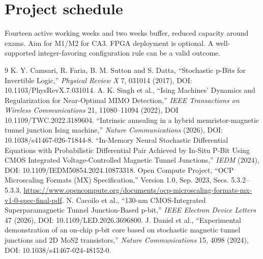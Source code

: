 \documentclass[11pt,a4paper]{article}
\begin{document}
\section{Project schedule}
Fourteen active working weeks and two weeks buffer, reduced capacity around exams. Aim for M1/M2 for CA3. FPGA deployment is optional. A well-supported integer-favoring configuration rule can be a valid outcome.
\begin{thebibliography}{9}
 K. Y. Camsari, R. Faria, B. M. Sutton and S. Datta, ``Stochastic p-Bits for Invertible Logic,'' \emph{Physical Review X} 7, 031014 (2017), DOI: 10.1103/PhysRevX.7.031014.
 A. K. Singh et al., ``Ising Machines' Dynamics and Regularization for Near-Optimal MIMO Detection,'' \emph{IEEE Transactions on Wireless Communications} 21, 11080--11094 (2022), DOI 10.1109/TWC.2022.3189604.
 ``Intrinsic annealing in a hybrid memristor-magnetic tunnel junction Ising machine,'' \emph{Nature Communications} (2026), DOI: 10.1038/s41467-026-71844-8.
 ``In-Memory Neural Stochastic Differential Equations with Probabilistic Differential Pair Achieved by In-Situ P-Bit Using CMOS Integrated Voltage-Controlled Magnetic Tunnel Junctions,'' \emph{IEDM} (2024), DOI: 10.1109/IEDM50854.2024.10873318.
 Open Compute Project, ``OCP Microscaling Formats (MX) Specification,'' Version 1.0, Sep. 2023, Secs. 5.3.2--5.3.3, \url{https://www.opencompute.org/documents/ocp-microscaling-formats-mx-v1-0-spec-final-pdf}.
 N. Cacoilo et al., ``130-nm CMOS-Integrated Superparamagnetic Tunnel Junction-Based p-bit,'' \emph{IEEE Electron Device Letters} 47 (2026), DOI: 10.1109/LED.2026.3696800.
 J. Daniel et al., ``Experimental demonstration of an on-chip p-bit core based on stochastic magnetic tunnel junctions and 2D MoS2 transistors,'' \emph{Nature Communications} 15, 4098 (2024), DOI: 10.1038/s41467-024-48152-0.
\end{thebibliography}
\end{document}

